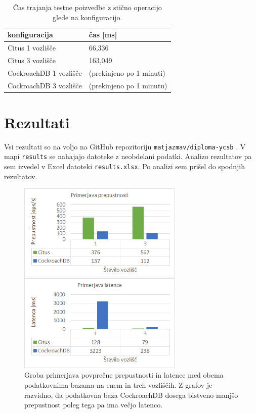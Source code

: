 \documentclass[a4paper, 12pt]{book}
\begin{document}
\begin{table}[H]
\begin{center}
\begin{tabular}{ l|l } 
\textbf{konfiguracija} & \textbf{čas [ms]} \\
\hline
Citus 1 vozlišče        & 66,336 \\
Citus 3 vozlišče        & 163,049 \\
CockroachDB 1 vozlišče  & (prekinjeno po 1 minuti)\\
CockroachDB 3 vozlišče  & (prekinjeno po 1 minutu)\\
\end{tabular}
\end{center}
\caption{Čas trajanja testne poizvedbe z stično operacijo glede na konfiguracijo.}
\label{tbl_benchmarking_joins}
\end{table}

\newpage

\section{Rezultati}
Vsi rezultati so na voljo na GitHub repozitoriju \texttt{matjazmav/diploma-ycsb} \cite{matjazmav/diploma-ycsb}. V mapi \texttt{results} se nahajajo datoteke z neobdelani podatki. Analizo rezultatov pa sem izvedel v Excel datoteki \texttt{results.xlsx}. Po analizi sem prišel do spodnjih rezultatov.

\begin{figure}[H]
\begin{center}
\includegraphics[width=0.7\textwidth]{resources/top-level-comparison.png}
\end{center}
\caption{Groba primerjava povprečne prepustnosti in latence med obema podatkovnima bazama na enem in treh vozliščih. Z grafov je razvidno, da podatkovna baza CockroachDB dosega bistveno manjšo prepustnost poleg tega pa ima večjo latenco.}
\label{img_ycsb_results_top_level_comparison}
\end{figure}
\end{document}
